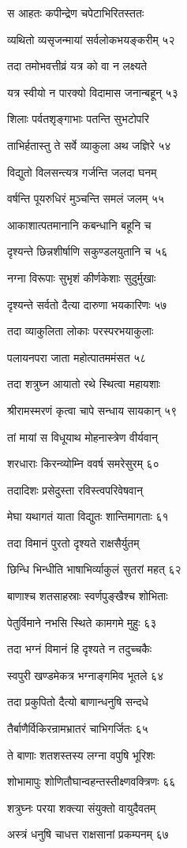स आहतः कपीन्द्रेण चपेटाभिरितस्ततः

व्यथितो व्यसृजन्मायां सर्वलोकभयङ्करीम् ५२

तदा तमोभवत्तीव्रं यत्र को वा न लक्ष्यते

यत्र स्वीयो न पारक्यो विदामास जनान्बहून् ५३

शिलाः पर्वतशृङ्गाभाः पतन्ति सुभटोपरि

ताभिर्हतास्तु ते सर्वे व्याकुला अथ जज्ञिरे ५४

विद्युतो विलसन्त्यत्र गर्जन्ति जलदा घनम्

वर्षन्ति पूयरुधिरं मुञ्चन्ति समलं जलम् ५५

आकाशात्पतमानानि कबन्धानि बहूनि च

दृश्यन्ते छिन्नशीर्षाणि सकुण्डलयुतानि च ५६

नग्ना विरूपाः सुभृशं कीर्णकेशाः सुदुर्मुखाः

दृश्यन्ते सर्वतो दैत्या दारुणा भयकारिणः ५७

तदा व्याकुलिता लोकाः परस्परभयाकुलाः

पलायनपरा जाता महोत्पातममंसत ५८

तदा शत्रुघ्न आयातो रथे स्थित्वा महायशाः

श्रीरामस्मरणं कृत्वा चापे सन्धाय सायकान् ५९

तां मायां स विधूयाथ मोहनास्त्रेण वीर्यवान्

शरधाराः किरन्व्योम्नि ववर्ष समरेसुरम् ६०

तदादिशः प्रसेदुस्ता रविस्त्वपरिवेषवान्

मेघा यथागतं याता विद्युतः शान्तिमागताः ६१

तदा विमानं पुरतो दृश्यते राक्षसैर्युतम्

छिन्धि भिन्धीति भाषाभिर्व्याकुलं सुतरां महत् ६२

बाणाश्च शतसाहस्राः स्वर्णपुङ्खैश्च शोभिताः

पेतुर्विमाने नभसि स्थिते कामगमे मुहुः ६३

तदा भग्नं विमानं हि दृश्यते न तदुच्चकैः

स्वपुरी खण्डमेकत्र भग्नाङ्गमिव भूतले ६४

तदा प्रकुपितो दैत्यो बाणान्धनुषि सन्दधे

तैर्बाणैर्विकिरन्रामभ्रातरं चाभिगर्जितः ६५

ते बाणाः शतशस्तस्य लग्ना वपुषि भूरिशः

शोभामापुः शोणितौघान्वहन्तस्तीक्ष्णवक्त्रिणः ६६

शत्रुघ्नः परया शक्त्या संयुक्तो वायुदैवतम्

अस्त्रं धनुषि चाधत्त राक्षसानां प्रकम्पनम् ६७

